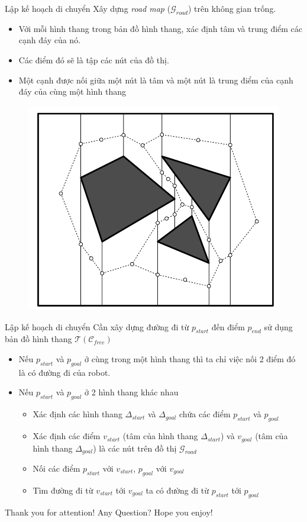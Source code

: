 \documentclass[compress]{beamer}
\begin{document}
\begin{frame}{Lập kế hoạch di chuyển}
Xây dựng \emph{road map} ($\mathcal{G}_{road}$) trên không gian trống. 
\begin{itemize}
\item Với mỗi hình thang trong bản đồ hình thang, xác định tâm và trung điểm các cạnh đáy của nó. 
\item Các điểm đó sẽ là tập các nút của đồ thị.
\item Một cạnh được nối giữa một nút là tâm và một nút là trung điểm của cạnh đáy của cùng một hình thang
\end{itemize}
\begin{figure}[H]
\centering
\includegraphics[scale=0.2]{road_map.png}
\end{figure}
\end{frame}

\begin{frame}{Lập kế hoạch di chuyển}
Cần xây dựng đường đi từ $p_{start}$ đến điểm $p_{end}$ sử dụng bản đồ hình thang $\mathcal{T}(\mathcal{C}_{free})$
\begin{itemize}
\item Nếu $p_{start}$ và $p_{goal}$ ở cùng trong một hình thang thì ta chỉ việc nối 2 điểm đó là có đường đi của robot.
\item Nếu $p_{start}$ và $p_{goal}$ ở 2 hình thang khác nhau
\begin{itemize}
\item Xác định các hình thang $\Delta_{start}$ và $\Delta_{goal}$ chứa các điểm $p_{start}$ và $p_{goal}$
\item Xác định các điểm $v_{start}$ (tâm của hình thang $\Delta_{start}$) và $v_{goal}$ (tâm của hình thang $\Delta_{goal}$) là các nút trên đồ thị $\mathcal{G}_{road}$
\item Nối các điểm $p_{start}$ với $v_{start}$, $p_{goal}$ với $v_{goal}$
\item Tìm đường đi từ $v_{start}$ tới $v_{goal}$ ta có đường đi từ $p_{start}$ tới $p_{goal}$
\end{itemize}
\end{itemize}
\end{frame}



\begin{frame}[plain]{Thank you for attention! Any Question?}
Hope you enjoy!
\end{frame}
\end{document}
